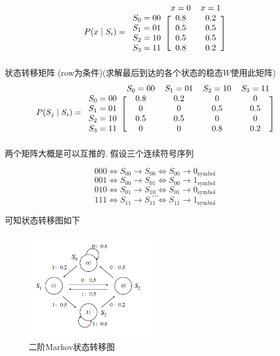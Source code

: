 \documentclass[a4paper]{report}
\begin{document}
\[
  P(x\mid S_i)=
\begin{blockarray}{ccc}
 &x=0 & x=1   \\
\begin{block}{c[cc]}
  S_0=00 & 0.8 & 0.2  \\
  S_1=01 & 0.5 & 0.5  \\
  S_2=10 & 0.5 & 0.5  \\
  S_3=11 & 0.8 & 0.2  \\
\end{block}
\end{blockarray}
 \]
 状态转移矩阵 (row为条件)(求解最后到达的各个状态的稳态$W$使用此矩阵)
\[
  P(S_j\mid S_i)=
\begin{blockarray}{ccccc}
 &S_0=00 & S_1=01 &S_2=10&S_3=11  \\
\begin{block}{c[cccc]}
  S_0=00 & 0.8 & 0.2&0&0  \\
  S_1=01 &0&0& 0.5 & 0.5  \\
  S_2=10 & 0.5 & 0.5&0&0  \\
  S_3=11 &0&0& 0.8 & 0.2  \\
\end{block}
\end{blockarray}
 \]
两个矩阵大概是可以互推的. 假设三个连续符号序列

$$000\Leftrightarrow S_{00}\rightarrow S_{00} \Leftrightarrow S_{00}\rightarrow 0_{\text{symbol}}$$
$$001\Leftrightarrow S_{00}\rightarrow S_{01} \Leftrightarrow S_{00}\rightarrow 1_{\text{symbol}}$$
$$010\Leftrightarrow S_{01}\rightarrow S_{10} \Leftrightarrow S_{01}\rightarrow 0_{\text{symbol}}$$
$$\dots$$
$$111\Leftrightarrow S_{11}\rightarrow S_{11} \Leftrightarrow S_{11}\rightarrow 1_{\text{symbol}}$$


可知状态转移图如下
\begin{figure}[H]
\centering
\includegraphics[width=0.5\textwidth]{markov.png}
\caption{二阶Markov状态转移图}
\end{figure}
\end{document}
